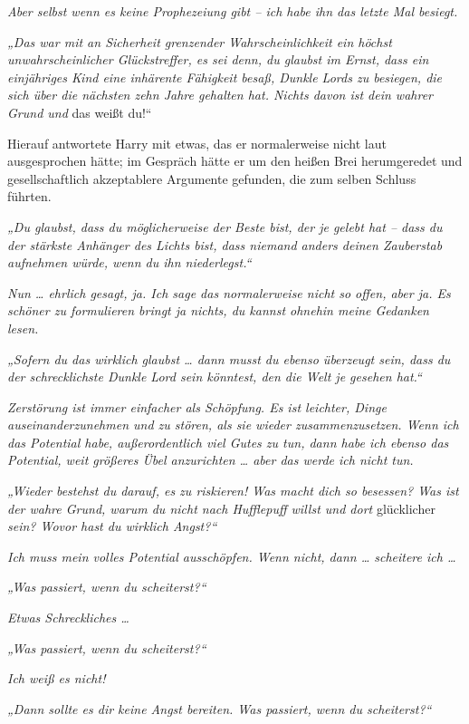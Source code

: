 \emph{Aber selbst wenn es keine Prophezeiung gibt – ich habe ihn das letzte Mal besiegt. }

\emph{„Das war mit an Sicherheit grenzender Wahrscheinlichkeit ein höchst unwahrscheinlicher Glückstreffer, es sei denn, du glaubst im Ernst, dass ein einjähriges Kind eine inhärente Fähigkeit besaß, Dunkle Lords zu besiegen, die sich über die nächsten zehn Jahre gehalten hat. Nichts davon ist dein wahrer Grund und} das weißt du!“ 

Hierauf antwortete Harry mit etwas, das er normalerweise nicht laut ausgesprochen hätte; im Gespräch hätte er um den heißen Brei herumgeredet und gesellschaftlich akzeptablere Argumente gefunden, die zum selben Schluss führten. 

\emph{„Du glaubst, dass du möglicherweise der Beste bist, der je gelebt hat – dass du der stärkste Anhänger des Lichts bist, dass niemand anders deinen Zauberstab aufnehmen würde, wenn du ihn niederlegst.“ }

\emph{Nun … ehrlich gesagt, ja. Ich sage das normalerweise nicht so offen, aber ja. Es schöner zu formulieren bringt ja nichts, du kannst ohnehin meine Gedanken lesen. }

\emph{„Sofern du das wirklich glaubst … dann musst du ebenso überzeugt sein, dass du der schrecklichste Dunkle Lord sein könntest, den die Welt je gesehen hat.“ }

\emph{Zerstörung ist immer einfacher als Schöpfung. Es ist leichter, Dinge auseinanderzunehmen und zu stören, als sie wieder zusammenzusetzen. Wenn ich das Potential habe, außerordentlich viel Gutes zu tun, dann habe ich ebenso das Potential, weit größeres Übel anzurichten … aber das werde ich nicht tun. }

\emph{„Wieder bestehst du darauf, es zu riskieren! Was macht dich so besessen? Was ist der wahre Grund, warum du nicht nach Hufflepuff willst und dort }glücklicher\emph{ sein? Wovor hast du wirklich Angst?“ }

\emph{Ich muss mein volles Potential ausschöpfen. Wenn nicht, dann … scheitere ich … }

\emph{„Was passiert, wenn du scheiterst?“ }

\emph{Etwas Schreckliches … }

\emph{„Was passiert, wenn du scheiterst?“ }

\emph{Ich weiß es nicht! }

\emph{„Dann sollte es dir keine Angst bereiten. Was passiert, wenn du scheiterst?“ }

